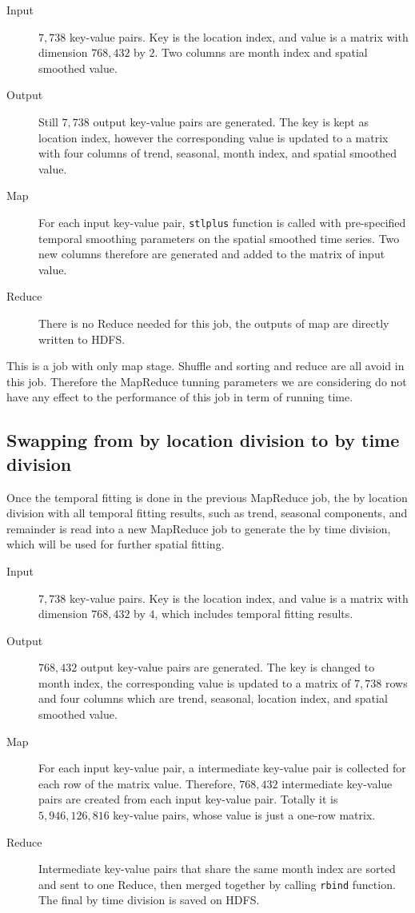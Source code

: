 \begin{description}
\item[Input] $7,738$ key-value pairs. Key is the location index, and value is a 
matrix with dimension $768,432$ by $2$. Two columns are month index and spatial
smoothed value.
\item[Output] Still $7,738$ output key-value pairs are generated. The key is kept
as location index, however the corresponding value is updated to a matrix with 
four columns of trend, seasonal, month index, and spatial smoothed value. 
\item[Map] For each input key-value pair, \texttt{stlplus} function is called
with pre-specified temporal smoothing parameters on the spatial smoothed time
series. Two new columns therefore are generated and added to the matrix of input
value. 
\item[Reduce] There is no Reduce needed for this job, the outputs of map are 
directly written to HDFS.
\end{description}

This is a job with only map stage. Shuffle and sorting and reduce are all avoid 
in this job. Therefore the MapReduce tunning parameters we are considering do
not have any effect to the performance of this job in term of running time.

\subsection{Swapping from by location division to by time division}

Once the temporal fitting is done in the previous MapReduce job, the by location
division with all temporal fitting results, such as trend, seasonal components,
and remainder is read into a new MapReduce job to generate the by time division,
which will be used for further spatial fitting.

\begin{description}
\item[Input] $7,738$ key-value pairs. Key is the location index, and value is a 
matrix with dimension $768,432$ by $4$, which includes temporal fitting results.
\item[Output] $768,432$ output key-value pairs are generated. The key is changed
to month index, the corresponding value is updated to a matrix of $7,738$ rows 
and four columns which are trend, seasonal, location index, and spatial smoothed 
value. 
\item[Map] For each input key-value pair, a intermediate key-value pair is 
collected for each row of the matrix value. Therefore, $768,432$ intermediate
key-value pairs are created from each input key-value pair. Totally it is 
$5,946,126,816$ key-value pairs, whose value is just a one-row matrix.
\item[Reduce] Intermediate key-value pairs that share the same month index are 
sorted and sent to one Reduce, then merged together by calling \texttt{rbind}
function. The final by time division is saved on HDFS.
\end{description}

